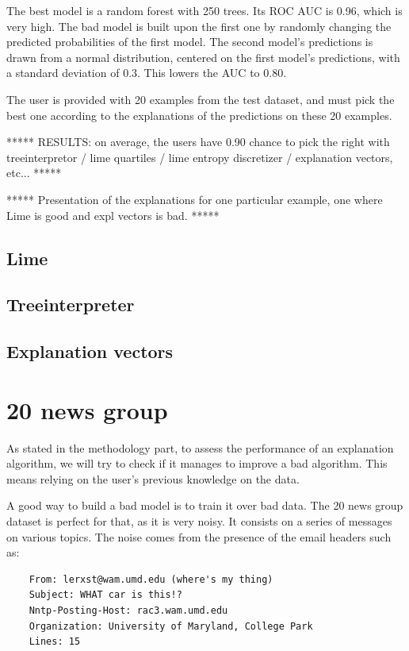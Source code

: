 \documentclass[a4paper,11pt]{kth-mag}
\begin{document}
The best model is a random forest with 250 trees. Its ROC AUC is 0.96, which is very high. The bad model is built upon the first one by randomly changing the predicted probabilities of the first model. The second model's predictions is drawn from a normal distribution, centered on the first model's predictions, with a standard deviation of 0.3. This lowers the AUC to 0.80.

The user is provided with 20 examples from the test dataset, and must pick the best one according to the explanations of the predictions on these 20 examples.


***** RESULTS: on average, the users have 0.90 chance to pick the right with treeinterpretor / lime quartiles / lime entropy discretizer / explanation vectors, etc... *****

***** Presentation of the explanations for one particular example, one where Lime is good and expl vectors is bad. *****

\subsection{Lime}

\subsection{Treeinterpreter}

\subsection{Explanation vectors}



\section{20 news group}

As stated in the methodology part, to assess the performance of an explanation algorithm, we will try to check if it manages to improve a bad algorithm. This means relying on the user's previous knowledge on the data.

A good way to build a bad model is to train it over bad data. The 20 news group dataset is perfect for that, as it is very noisy. It consists on a series of messages on various topics. The noise comes from the presence of the email headers such as:

\footnotesize
\begin{verbatim}
	From: lerxst@wam.umd.edu (where's my thing)
	Subject: WHAT car is this!?
	Nntp-Posting-Host: rac3.wam.umd.edu
	Organization: University of Maryland, College Park
	Lines: 15
\end{verbatim}
\normalsize
\end{document}
